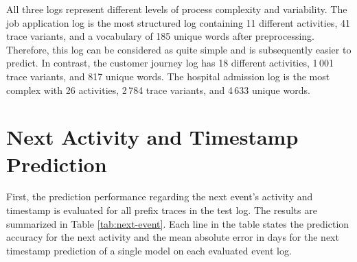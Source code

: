 All three logs represent different levels of process complexity and variability.
The job application log is the most structured log containing 11 different activities, 41 trace variants, and a vocabulary of 185 unique words after preprocessing.
Therefore, this log can be considered as quite simple and is subsequently easier to predict.
In contrast, the customer journey log has 18 different activities, 1\,001 trace variants, and 817 unique words.
The hospital admission log is the most complex with 26 activities, 2\,784 trace variants, and 4\,633 unique words.

\section{Next Activity and Timestamp Prediction}

First, the prediction performance regarding the next event's activity and timestamp is evaluated for all prefix traces in the test log.
The results are summarized in Table \ref{tab:next-event}.
Each line in the table states the prediction accuracy for the next activity and the mean absolute error in days for the next timestamp prediction of a single model on each evaluated event log.

